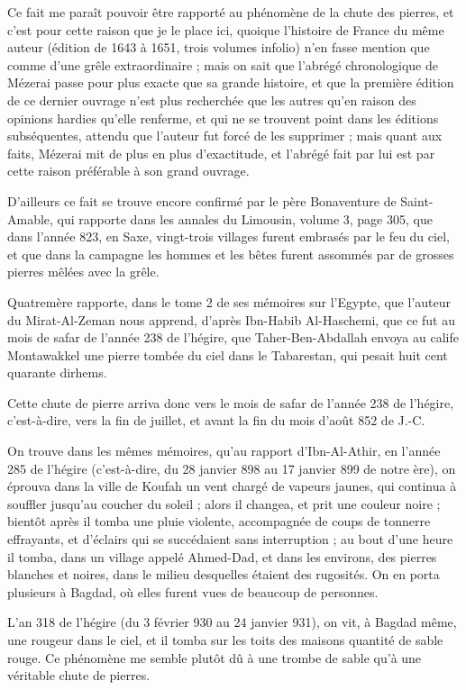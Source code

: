 \documentclass[a4paper, 12pt, oneside, french]{article}
\begin{document}
Ce fait me paraît pouvoir être rapporté au phénomène de la chute des pierres, et c'est pour cette raison que je le place ici, quoique l'histoire de France du même auteur (édition de 1643 à 1651, trois volumes infolio) n'en fasse mention que comme d'une grêle extraordinaire ; mais on sait que l'abrégé chronologique de Mézerai passe pour plus exacte que sa grande histoire, et que la première édition de ce dernier ouvrage n'est plus recherchée que les autres qu'en raison des opinions hardies qu'elle renferme, et qui ne se trouvent point dans les éditions subséquentes, attendu que l'auteur fut forcé de les supprimer ; mais quant aux faits, Mézerai mit de plus en plus d'exactitude, et l'abrégé fait par lui est par cette raison préférable à son grand ouvrage.

D'ailleurs ce fait se trouve encore confirmé par le père Bonaventure de Saint-Amable, qui rapporte dans les annales du Limousin, volume 3, page 305, que dans l'année 823, en Saxe, vingt-trois villages furent embrasés par le feu du ciel, et que dans la campagne les hommes et les bêtes furent assommés par de grosses pierres mêlées avec la grêle.

Quatremère rapporte, dans le tome 2 de ses mémoires sur l'Egypte, que l'auteur du Mirat-Al-Zeman nous apprend, d'après Ibn-Habib Al-Haschemi, que ce fut au mois de safar de l'année 238 de l'hégire, que Taher-Ben-Abdallah envoya au calife Montawakkel une pierre tombée du ciel dans le Tabarestan, qui pesait huit cent quarante dirhems.

Cette chute de pierre arriva donc vers le mois de safar de l'année 238 de l'hégire, c'est-à-dire, vers la fin de juillet, et avant la fin du mois d'août 852 de J.-C.

On trouve dans les mêmes mémoires, qu'au rapport d'Ibn-Al-Athir, en l'année 285 de l'hégire (c'est-à-dire, du 28 janvier 898 au 17 janvier 899 de notre ère), on éprouva dans la ville de Koufah un vent chargé de vapeurs jaunes, qui continua à souffler jusqu'au coucher du soleil ; alors il changea, et prit une couleur noire ; bientôt après il tomba une pluie violente, accompagnée de coups de tonnerre effrayants, et d'éclairs qui se succédaient sans interruption ; au bout d'une heure il tomba, dans un village appelé Ahmed-Dad, et dans les environs, des pierres blanches et noires, dans le milieu desquelles étaient des rugosités. On en porta plusieurs à Bagdad, où elles furent vues de beaucoup de personnes.

L'an 318 de l'hégire (du 3 février 930 au 24 janvier 931), on vit, à Bagdad même, une rougeur dans le ciel, et il tomba sur les toits des maisons quantité de sable rouge. Ce phénomène me semble plutôt dû à une trombe de sable qu'à une véritable chute de pierres.
\end{document}
